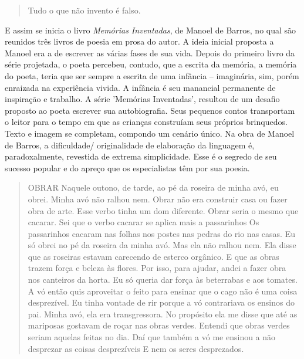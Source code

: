 \documentclass[11pt]{extarticle}
\begin{document}
\begin{quote}

Tudo o que não invento é falso.

\end{quote}

E assim se inicia o livro \textit{Memórias Inventadas}, de Manoel de Barros, no qual são reunidos três livros de poesia em prosa do autor. A ideia inicial proposta a Manoel era a de escrever as várias fases de sua vida. Depois do primeiro livro da série projetada, o poeta percebeu, contudo, que a escrita da memória, a memória do poeta, teria que ser sempre a escrita de uma infância – imaginária, sim, porém enraizada na experiência vivida. A infância é seu manancial permanente de inspiração e trabalho. A série 'Memórias Inventadas', resultou de um desafio proposto ao poeta escrever sua autobiografia. Seus pequenos contos transportam o leitor para o tempo em que as crianças construíam seus próprios brinquedos. Texto e imagem se completam, compondo um cenário único. Na obra de Manoel de Barros, a dificuldade/ originalidade de elaboração da linguagem é, paradoxalmente, revestida de extrema simplicidade. Esse é o segredo de seu sucesso popular e do apreço que os especialistas têm por sua poesia.

\begin{quote}

OBRAR
Naquele outono, de tarde, ao pé da roseira de minha avó, eu obrei. Minha avó não ralhou nem. Obrar não era construir casa ou fazer obra de arte. Esse verbo tinha um dom diferente. Obrar seria o mesmo que cacarar. Sei que o verbo cacarar se aplica mais a passarinhos Os passarinhos cacaram nas folhas nos postes nas pedras do rio nas casas. Eu só obrei no pé da roseira da minha avó. Mas ela não ralhou nem. Ela disse que as roseiras estavam carecendo de esterco orgânico. E que as obras trazem força e beleza às flores. Por isso, para ajudar, andei a fazer obra nos canteiros da horta. Eu só queria dar força às beterrabas e aos tomates. A vó então quis aproveitar o feito para ensinar que o cago não é uma coisa desprezível. Eu tinha vontade de rir porque a vó contrariava os ensinos do pai. Minha avó, ela era transgressora. No propósito ela me disse que até as mariposas gostavam de roçar nas obras verdes. Entendi que obras verdes seriam aquelas feitas no dia. Daí que também a vó me ensinou a não desprezar as coisas desprezíveis E nem os seres desprezados. 


\end{quote}
\end{document}

